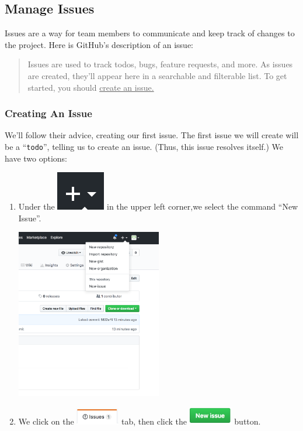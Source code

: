 \documentclass[11pt]{article}
\begin{document}
\subsection{Manage Issues}

Issues are a way for team members to communicate and keep track of changes to the project.  Here is GitHub's description of an issue:~\cite{github-issues} \\

\begin{quote}
Issues are used to track todos, bugs, feature requests, and more. As issues are created, they'll appear here in a searchable and filterable list. To get started, you should \underline{create an issue.}
\end{quote} 

\subsubsection{Creating An Issue}
We'll follow their advice, creating our first issue. The first issue we will create will be a ``\texttt{todo}'', telling us to create an issue. (Thus, this issue resolves itself.) We have two options: 

\begin{enumerate}

\item Under the \includegraphics{PlusMenu} in the upper left corner,we select the command ``New Issue''. \\

\begin{center}
\includegraphics[width=0.5\textwidth]{NewIssueMenu}
\end{center}

\item We click on the \includegraphics[width=0.75in]{IssuesLink} tab, then click the \includegraphics[width=0.75in]{NewIssueButton} button. 

\end{enumerate} 
\end{document}
